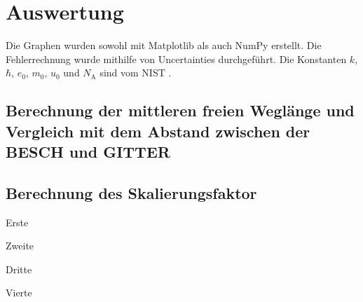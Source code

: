 \section{Auswertung}
\label{sec:Auswertung}


Die Graphen wurden sowohl mit Matplotlib \cite{matplotlib} als auch NumPy \cite{numpy} erstellt. Die
Fehlerrechnung wurde mithilfe von Uncertainties \cite{uncertainties} durchgeführt.
Die Konstanten $k$, $\hbar$, $e_0$, $m_0$, $u_0$ und $N_\text{A}$ sind vom NIST \cite{nistgov}.

\subsection{Berechnung der mittleren freien Weglänge und Vergleich mit dem Abstand zwischen der BESCH und GITTER}

\subsection{Berechnung des Skalierungsfaktor}

\begin{center}
	\begin{table}
		\begin{minipage}[t]{0.5\textwidth}
			\caption{Erste}
			\centering
			
		\end{minipage}
		\begin{minipage}[t]{0.5\textwidth}
			\caption{Zweite}
			\centering
			
		\end{minipage}
	\end{table}
\end{center}
\begin{center}
	\begin{table}
		\begin{minipage}[t]{0.5\textwidth}
			\caption{Dritte}
			\centering
			
		\end{minipage}
		\begin{minipage}[t]{0.5\textwidth}
			\caption{Vierte}
			\centering
			
		\end{minipage}
	\end{table}
\end{center}

